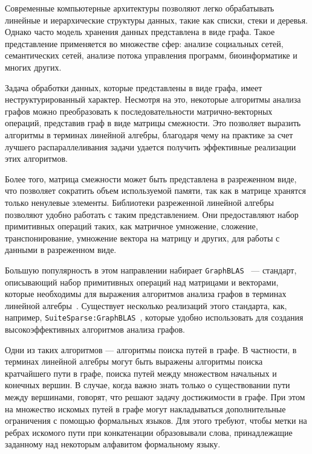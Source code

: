 
Современные компьютерные архитектуры позволяют легко обрабатывать линейные и иерархические структуры данных, такие как списки, стеки и деревья. Однако часто модель хранения данных представлена в виде графа. Такое представление применяется во множестве сфер: анализе социальных сетей, семантических сетей, анализе потока управления программ, биоинформатике и многих других.

Задача обработки данных, которые представлены в виде графа, имеет неструктурированный характер. Несмотря на это, некоторые алгоритмы анализа графов можно преобразовать к последовательности матрично-векторных операций, представив граф в виде матрицы смежности. Это позволяет выразить алгоритмы в терминах линейной алгебры, благодаря чему на практике за счет лучшего распараллеливания задачи удается получить эффективные реализации этих алгоритмов.

Более того, матрица смежности может быть представлена в разреженном виде, что позволяет сократить объем используемой памяти, так как в матрице хранятся только ненулевые элементы. Библиотеки разреженной линейной алгебры позволяют удобно работать с таким представлением. Они предоставляют набор примитивных операций таких, как матричное умножение, сложение, транспонирование, умножение вектора на матрицу и других, для работы с данными в разреженном виде.

Большую популярность в этом направлении набирает \verb|GraphBLAS|~\cite{intro_graphblas} --- стандарт, описывающий набор примитивных операций над матрицами и векторами, которые необходимы для выражения алгоритмов анализа графов в терминах линейной алгебры~\cite{intro_graphlastd}. Существует несколько реализаций этого стандарта, как, например, \verb|SuiteSparse:GraphBLAS|~\cite{intro_suitesparse}, которые удобно использовать для создания высокоэффективных алгоритмов анализа графов.

Одни из таких алгоритмов --- алгоритмы поиска путей в графе. В частности, в терминах линейной алгебры могут быть выражены алгоритмы поиска кратчайшего пути в графе, поиска путей между множеством начальных и конечных вершин. В случае, когда важно знать только о существовании пути между вершинами, говорят, что решают задачу достижимости в графе. При этом на множество искомых путей в графе могут накладываться дополнительные ограничения с помощью формальных языков. Для этого требуют, чтобы метки на ребрах искомого пути при конкатенации образовывали слова, принадлежащие заданному над некоторым алфавитом формальному языку.

